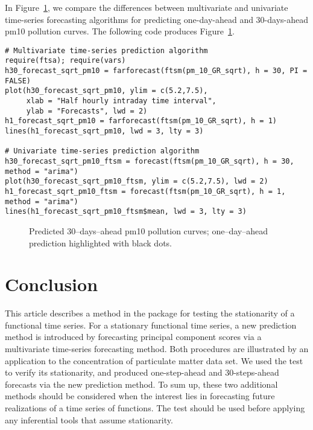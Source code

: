 \documentclass[nojss]{jss}
\begin{document}
In Figure~\ref{f:pm10}, we compare the differences between multivariate and univariate time-series forecasting algorithms for predicting one-day-ahead and 30-days-ahead pm10 pollution curves. The following code produces Figure~\ref{f:pm10}. 
\begin{Verbatim}
# Multivariate time-series prediction algorithm
require(ftsa); require(vars)
h30_forecast_sqrt_pm10 = farforecast(ftsm(pm_10_GR_sqrt), h = 30, PI = FALSE)
plot(h30_forecast_sqrt_pm10, ylim = c(5.2,7.5), 
     xlab = "Half hourly intraday time interval",
     ylab = "Forecasts", lwd = 2)
h1_forecast_sqrt_pm10 = farforecast(ftsm(pm_10_GR_sqrt), h = 1)
lines(h1_forecast_sqrt_pm10, lwd = 3, lty = 3)

# Univariate time-series prediction algorithm
h30_forecast_sqrt_pm10_ftsm = forecast(ftsm(pm_10_GR_sqrt), h = 30, method = "arima")
plot(h30_forecast_sqrt_pm10_ftsm, ylim = c(5.2,7.5), lwd = 2)
h1_forecast_sqrt_pm10_ftsm = forecast(ftsm(pm_10_GR_sqrt), h = 1, method = "arima")
lines(h1_forecast_sqrt_pm10_ftsm$mean, lwd = 3, lty = 3)
\end{Verbatim}

\begin{figure}[!htbp]
\centering
{}\quad
{}
\caption{Predicted 30--days--ahead pm10 pollution curves; one--day--ahead prediction highlighted with black dots.}\label{f:pm10}
\end{figure}

\section{Conclusion}\label{sec:4}

This article describes a method in the  package for testing the stationarity of a functional time series. For a stationary functional time series, a new prediction method is introduced by forecasting principal component scores via a multivariate time-series forecasting method. Both procedures are illustrated by an application to the concentration of particulate matter data set. We used the test to verify its stationarity, and produced one-step-ahead and 30-steps-ahead forecasts via the new prediction method. To sum up, these two additional methods should be considered when the interest lies in forecasting future realizations of a time series of functions. The test should be used before applying any inferential tools that assume stationarity.




\end{document}

